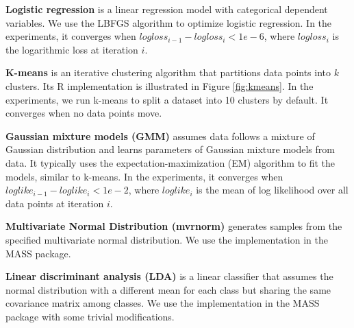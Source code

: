 \noindent \textbf{Logistic regression} is a linear regression model with
categorical dependent variables. We use the LBFGS algorithm \cite{lbfgs}
to optimize logistic regression. In the experiments, it converges when
$logloss_{i-1}-logloss_i < 1e-6$, where $logloss_i$ is the logarithmic loss
at iteration $i$.

\noindent \textbf{K-means} is an iterative clustering algorithm that
partitions data points into $k$ clusters. Its R implementation is illustrated
in Figure \ref{fig:kmeans}. In the experiments, we run k-means to split
a dataset into 10 clusters by default. It converges when no data points
move.

\noindent \textbf{Gaussian mixture models (GMM)} assumes data follows
a mixture of Gaussian distribution and learns parameters of Gaussian mixture
models from data. It typically uses the expectation-maximization (EM)
algorithm \cite{em} to fit the models, similar to k-means. In the experiments,
it converges when $loglike_{i-1} - loglike_i < 1e-2$, where $loglike_i$
is the mean of log likelihood over all data points at iteration $i$.

\noindent \textbf{Multivariate Normal Distribution (mvrnorm)} generates
samples from the specified multivariate normal distribution. We use
the implementation in the MASS package.

\noindent \textbf{Linear discriminant analysis (LDA)} is a linear classifier
that assumes the normal distribution with a different mean for each class
but sharing the same covariance matrix among classes. We use the implementation
in the MASS package with some trivial modifications.


